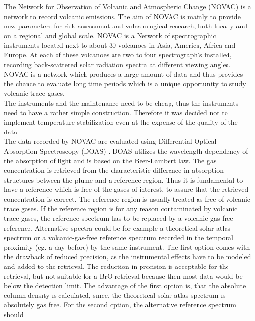 %
\newline
%
The Network for Observation of Volcanic and Atmospheric Change (NOVAC) is a network to record volcanic emissions. The aim of NOVAC is mainly to provide new parameters for risk assessment and volcanological research, both locally and on a regional and global scale.
NOVAC is a Network of spectrographic instruments located next to about 30 volcanoes in Asia, America, Africa and Europe. At each of these volcanoes are two to four spectrograph's installed, recording back-scattered solar radiation spectra at different viewing angles.\\
NOVAC is a network which produces a large amount of data and thus provides the chance to evaluate long time periods which is a unique opportunity to study volcanic trace gases.\\
The instruments and the maintenance need to be cheap, thus the instruments need to have a rather simple construction. Therefore it was decided not to implement temperature stabilization even at the expense of the quality of the data.\\
%
\newline
%
The data recorded by NOVAC are evaluated using Differential Optical Absorption Spectroscopy (DOAS) \citet{platt2008differential}. DOAS utilizes the wavelength dependency of the absorption of light and is based on the Beer-Lambert law. The gas concentration is retrieved from the characteristic difference in absorption structures between the plume and a reference region. Thus it is fundamental to have a reference which is free of the gases of interest, to assure that the retrieved concentration is correct.
%
\newline
%
The reference region is usually treated as free of
volcanic trace gases. If the reference region is for any reason
contaminated by volcanic trace gases, the reference spectrum has to be
replaced by a volcanic-gas-free reference. Alternative spectra could be for example a
theoretical solar atlas spectrum or a volcanic-gas-free reference
spectrum recorded in the temporal proximity (eg. a day before) by the same instrument.
The first option comes with the drawback of reduced precision, as the
instrumental effects have to be modeled and added to the retrieval. The reduction in precision is acceptable for the  retrieval, but not suitable for a BrO retrieval because then most data would be below the detection limit. The advantage of the first option is, that the absolute column density is calculated, since, the theoretical solar atlas spectrum is absolutely gas free. For the second option, the alternative reference spectrum should
